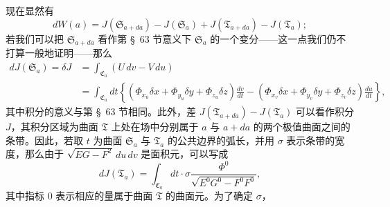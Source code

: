 \documentclass[11pt,a4paper,leqno]{article}
\begin{document}
现在显然有
\begin{equation}\tag{47}
dW(a)=J(\mathfrak{S}_{a+da})-J(\mathfrak{S}_a)
     +J(\mathfrak{T}_{a+da})-J(\mathfrak{T}_a);
\end{equation}
若我们可以把 $\mathfrak{S}_{a+da}$ 看作第 \S~63 节意义下 $\mathfrak{S}_a$
的一个变分——这一点我们仍不打算一般地证明——那么
\[
\begin{aligned}
dJ(\mathfrak{S}_a)=\delta J
&=\int_{\mathfrak{C}_a}(U\,dv-V\,du)\\
&=\int_{\mathfrak{C}_a}dt\left\{
(\Phi_{x_u}\delta x+\Phi_{y_u}\delta y+\Phi_{z_u}\delta z)\frac{dv}{dt}
-(\Phi_{x_v}\delta x+\Phi_{y_v}\delta y+\Phi_{z_v}\delta z)\frac{du}{dt}
\right\},
\end{aligned}
\]
其中积分的意义与第 \S~63 节相同。此外，差
$J(\mathfrak{T}_{a+da})-J(\mathfrak{T}_a)$ 可以看作积分 $J$，其积分区域为曲面
$\mathfrak{T}$ 上处在场中分别属于 $a$ 与 $a+da$ 的两个极值曲面之间的条带。因此，若取
$t$ 为曲面 $\mathfrak{S}_a$ 与 $\mathfrak{T}_a$ 的公共边界的弧长，并用 $\sigma$
表示条带的宽度，那么由于 $\sqrt{EG-F^2}\,du\,dv$ 是面积元，可以写成
\[
dJ(\mathfrak{T}_a)=\int_{\mathfrak{C}_a}dt\cdot\sigma
\frac{\Phi^0}{\sqrt{E^0G^0-F^0F^0}},
\]
其中指标 $0$ 表示相应的量属于曲面 $\mathfrak{T}$ 的曲面元。为了确定 $\sigma$，
\end{document}
